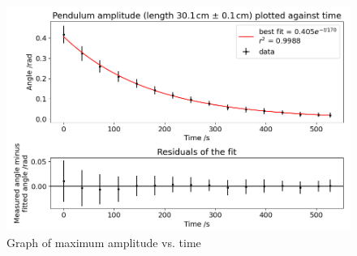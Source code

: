 \documentclass[12pt]{article}
\begin{document}
\begin{figure}[!hptb]
    \centering
    \includegraphics[width=\textwidth]{../figures/max_amplitude_vs_time.png}
    \caption{\centering Graph of maximum amplitude vs. time}
    \label{fig:figure 4}
\end{figure}
\end{document}
